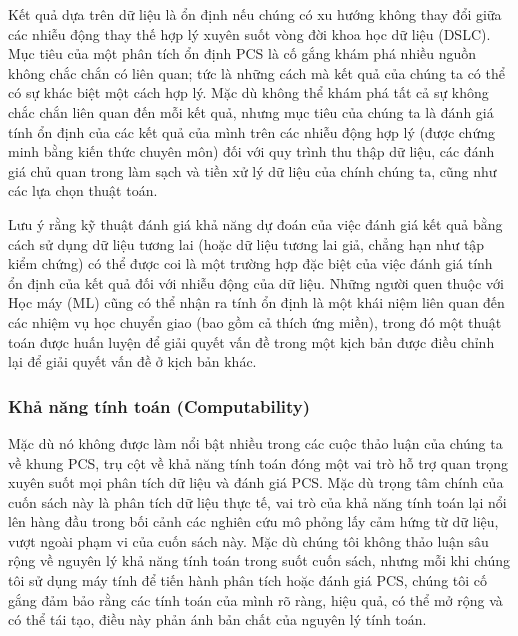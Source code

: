 \begin{tcolorbox}[title={Hộp 1.5: Tính ổn định}]
Kết quả dựa trên dữ liệu là ổn định nếu chúng có xu hướng không thay đổi giữa các nhiễu động thay thế hợp lý xuyên suốt vòng đời khoa học dữ liệu (DSLC). Mục tiêu của một phân tích ổn định PCS là cố gắng khám phá nhiều nguồn không chắc chắn có liên quan; tức là những cách mà kết quả của chúng ta có thể có sự khác biệt một cách hợp lý. Mặc dù không thể khám phá tất cả sự không chắc chắn liên quan đến mỗi kết quả, nhưng mục tiêu của chúng ta là đánh giá tính ổn định của các kết quả của mình trên các nhiễu động hợp lý (được chứng minh bằng kiến thức chuyên môn) đối với quy trình thu thập dữ liệu, các đánh giá chủ quan trong làm sạch và tiền xử lý dữ liệu của chính chúng ta, cũng như các lựa chọn thuật toán.
\end{tcolorbox}

Lưu ý rằng kỹ thuật đánh giá khả năng dự đoán của việc đánh giá kết quả bằng cách sử dụng dữ liệu tương lai (hoặc dữ liệu tương lai giả, chẳng hạn như tập kiểm chứng) có thể được coi là một trường hợp đặc biệt của việc đánh giá tính ổn định của kết quả đối với nhiễu động của dữ liệu. Những người quen thuộc với Học máy (ML) cũng có thể nhận ra tính ổn định là một khái niệm liên quan đến các nhiệm vụ học chuyển giao (bao gồm cả thích ứng miền), trong đó một thuật toán được huấn luyện để giải quyết vấn đề trong một kịch bản được điều chỉnh lại để giải quyết vấn đề ở kịch bản khác.

\subsubsection{Khả năng tính toán (Computability)}
Mặc dù nó không được làm nổi bật nhiều trong các cuộc thảo luận của chúng ta về khung PCS, trụ cột về khả năng tính toán đóng một vai trò hỗ trợ quan trọng xuyên suốt mọi phân tích dữ liệu và đánh giá PCS. Mặc dù trọng tâm chính của cuốn sách này là phân tích dữ liệu thực tế, vai trò của khả năng tính toán lại nổi lên hàng đầu trong bối cảnh các nghiên cứu mô phỏng lấy cảm hứng từ dữ liệu, vượt ngoài phạm vi của cuốn sách này. Mặc dù chúng tôi không thảo luận sâu rộng về nguyên lý khả năng tính toán trong suốt cuốn sách, nhưng mỗi khi chúng tôi sử dụng máy tính để tiến hành phân tích hoặc đánh giá PCS, chúng tôi cố gắng đảm bảo rằng các tính toán của mình rõ ràng, hiệu quả, có thể mở rộng và có thể tái tạo, điều này phản ánh bản chất của nguyên lý tính toán.

